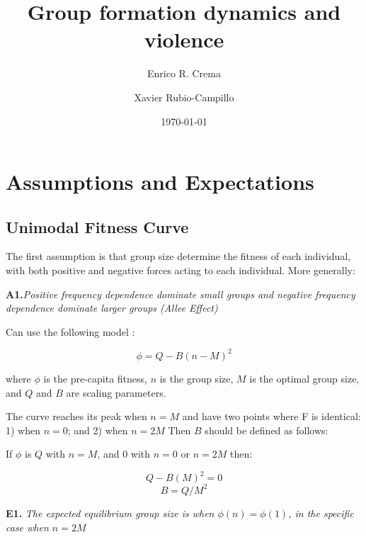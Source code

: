 \documentclass{article}
\begin{document}
\title{Group formation dynamics and violence} %
\author{Enrico R. Crema \and Xavier Rubio-Campillo}

\date{\today}

\maketitle

\section{Assumptions and Expectations}

\subsection{Unimodal Fitness Curve}

The first assumption is that group size determine the fitness of each individual, with both positive and negative forces acting to each individual. More generally:

\vspace{10 mm}
{\bf A1.}\emph{Positive frequency dependence dominate small groups and negative frequency dependence dominate larger groups (Allee Effect)}
\vspace{10 mm}



Can use the following model \citep{greene2001}:

\begin{equation}
\label{groupfitness}
\phi=Q-B(n-M)^2
\end{equation}

where $\phi$ is the pre-capita fitness, $n$ is the group size, $M$ is the optimal group size, and $Q$ and $B$ are scaling parameters.

The curve reaches its peak when $n=M$ and have two points where F is identical: 1) when $n=0$; and 2) when $n=2M$
Then $B$ should be defined as follows:

If $\phi$ is $Q$ with $n=M$, and $0$ with $n=0$ or $n=2M$ then:

$$Q-B(M)^2 = 0$$
$$B=Q/M^2$$

\vspace{10 mm}
{\bf E1.} \emph{The expected equilibrium group size is when $\phi(n)=\phi(1)$, in the specific case when $n=2M$}
\vspace{10 mm}
\end{document}
